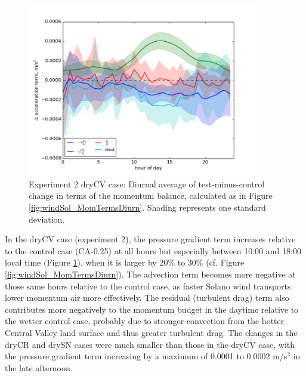 \begin{figure}[here]
\includegraphics[width=0.9\textwidth]{ch3-wind/img/momentum_terms_diurnal_diff_dryCV.png}
\caption{Experiment 2 dryCV case: Diurnal average of test-minus-control change in terms of the momentum balance, calculated as in Figure \ref{fig:windSol_MomTermsDiurn}.  Shading represents one standard deviation.}
\label{fig:windSol_MomTermsDiurnDiff}
\end{figure}

In the dryCV case (experiment 2), the pressure gradient term increases relative to the control case (CA-0.25) at all hours but especially between 10:00 and 18:00 local time (Figure \ref{fig:windSol_MomTermsDiurnDiff}), when it is larger by 20\% to 30\% (cf. Figure \ref{fig:windSol_MomTermsDiurn}).  The advection term becomes more negative at those same hours relative to the control case, as faster Solano wind transports lower momentum air more effectively.  The residual (turbulent drag) term also contributes more negatively to the momentum budget in the daytime relative to the wetter control case, probably due to stronger convection from the hotter Central Valley land surface and thus greater turbulent drag.  The changes in the dryCR and drySN cases were much smaller than those in the dryCV case, with the pressure gradient term increasing by a maximum of 0.0001 to 0.0002 m/s$^2$ in the late afternoon.

